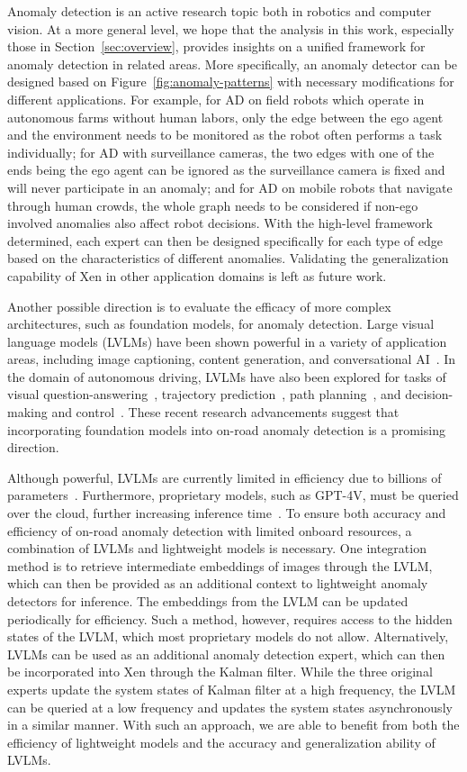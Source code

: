 Anomaly detection is an active research topic both in robotics and computer vision. At a more general level, we hope that the analysis in this work, especially those in Section~\ref{sec:overview}, provides insights on a unified framework for anomaly detection in related areas. More specifically, an anomaly detector can be designed based on Figure~\ref{fig:anomaly-patterns} with necessary modifications for different applications. For example, for AD on field robots which operate in autonomous farms without human labors, only the edge between the ego agent and the environment needs to be monitored as the robot often performs a task individually; for AD with surveillance cameras, the two edges with one of the ends being the ego agent can be ignored as the surveillance camera is fixed and will never participate in an anomaly; and for AD on mobile robots that navigate through human crowds, the whole graph needs to be considered if non-ego involved anomalies also affect robot decisions. With the high-level framework determined, each expert can then be designed specifically for each type of edge based on the characteristics of different anomalies. Validating the generalization capability of Xen in other application domains is left as future work.

Another possible direction is to evaluate the efficacy of more complex architectures, such as foundation models, for anomaly detection. Large visual language models (LVLMs) have been shown powerful in a variety of application areas, including image captioning, content generation, and conversational AI~\citep{jiang2024effectiveness}. In the domain of autonomous driving, LVLMs have also been explored for tasks of visual question-answering~\citep{xu2024drivegpt4}, trajectory prediction~\citep{wu2023language}, path planning~\citep{mao2023language}, and decision-making and control~\citep{wen2023road}. These recent research advancements suggest that incorporating foundation models into on-road anomaly detection is a promising direction.

Although powerful, LVLMs are currently limited in efficiency due to billions of parameters~\citep{brohan2022rt,brohan2023rt,padalkar2023open}. Furthermore, proprietary models, such as GPT-4V, must be queried over the cloud, further increasing inference time~\citep{achiam2023gpt}. To ensure both accuracy and efficiency of on-road anomaly detection with limited onboard resources, a combination of LVLMs and lightweight models is necessary. One integration method is to retrieve intermediate embeddings of images through the LVLM, which can then be provided as an additional context to lightweight anomaly detectors for inference. The embeddings from the LVLM can be updated periodically for efficiency. Such a method, however, requires access to the hidden states of the LVLM, which most proprietary models do not allow. Alternatively, LVLMs can be used as an additional anomaly detection expert, which can then be incorporated into Xen through the Kalman filter. While the three original experts update the system states of Kalman filter at a high frequency, the LVLM can be queried at a low frequency and updates the system states asynchronously in a similar manner. With such an approach, we are able to benefit from both the efficiency of lightweight models and the accuracy and generalization ability of LVLMs.
